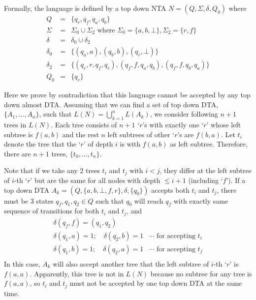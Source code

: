 \documentclass[10pt]{homework}
\begin{document}
Formally, the language is defined by a top down NTA
\(N = (Q, \Sigma, \delta, Q_0)\) where
\[
\begin{array}{rcl}
	       Q & = & \{q_r, q_f, q_a, q_b\}                                                                \\
	  \Sigma & = & \Sigma_0 \cup \Sigma_2 \text{ where } \Sigma_0 = \{a, b, \bot\}, \Sigma_2 =  \{r, f\} \\
	  \delta & = & \delta_0 \cup \delta_2                                                                \\
	\delta_0 & = & \{(q_a, a), (q_b, b), (q_r, \bot)\}                                                   \\
	\delta_2 & = & \{(q_r, r, q_f, q_r), (q_f, f, q_a, q_b), (q_f, f, q_b, q_a)\}                        \\
	     Q_0 & = & \{q_r\}
\end{array}
\]

Here we prove by contradiction that this language cannot be accepted by any top down almost DTA.
Assuming that we can find a set of top down DTA, \(\{A_1,\dots,A_n\}\),
such that \(L(N) = \bigcup_{k=1}^n L(A_k)\),
we consider following \(n+1\) trees in \(L(N)\).
Each tree consists of \(n+1\) `\(r\)'s with exactly one `\(r\)' whose left subtree is
\(f(a,b)\) and the rest \(n\) left subtrees of other `\(r\)'s are \(f(b,a)\).
Let \(t_i\) denote the tree that the `\(r\)' of depth \(i\) is with \(f(a,b)\) as left subtree.
Therefore, there are \(n+1\) trees, \(\{t_0,\dots,t_n\}\).

Note that if we take any 2 trees \(t_i\) and \(t_j\) with \(i<j\),
they differ at the left subtree of \(i\)-th `\(r\)' but are the same for all
nodes with depth \(\leq i+1\) (including `\(f\)').
If a top down DTA \(A_k= (Q, \{a,b,\bot,f,r\}, \delta, \{q_0\})\) accepts both \(t_i\) and \(t_j\),
there must be 3 states \(q_f, q_1, q_2 \in Q\) such that \(q_0\) will reach \(q_f\)
with exactly same sequence of transitions for both \(t_i\) and \(t_j\), and
\[
\begin{array}{ll}
\delta(q_f, f) = (q_1, q_2) \\
\delta(q_1, a) = 1;\quad \delta(q_2, b) = 1 & \cdots \text{ for accepting } t_i\\
\delta(q_1, b) = 1;\quad \delta(q_2, a) = 1 & \cdots \text{ for accepting } t_j\\
\end{array}
\]
In this case, \(A_k\) will also accept another tree that the left subtree of
\(i\)-th `\(r\)' is \(f(a,a)\).
Apparently, this tree is not in \(L(N)\) because no subtree for any tree is \(f(a,a)\),
so \(t_i\) and \(t_j\) must not be accepted by one top down DTA at the same time.
\end{document}
